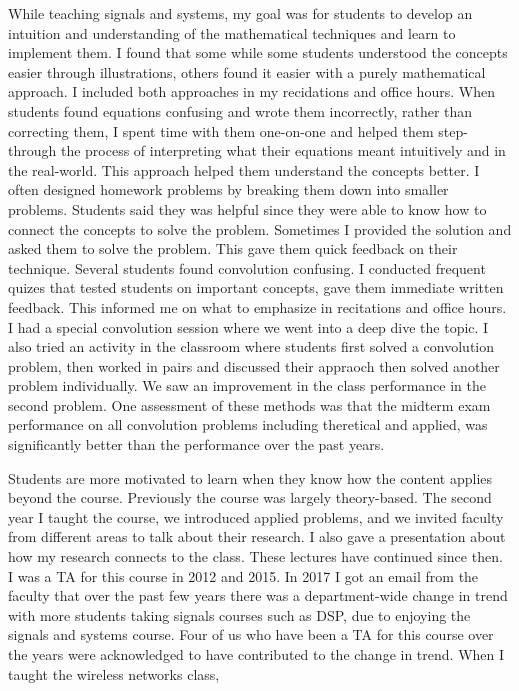 \documentclass[10pt]{article}
\begin{document}
While teaching signals and systems, %
my goal was for students to develop an intuition and understanding of the mathematical techniques and learn to implement them. I found that some while some students understood the concepts easier through illustrations, others found it easier with a purely mathematical approach. I included both approaches in my recidations and office hours. When students found equations confusing and wrote them incorrectly, rather than correcting them, I spent time with them one-on-one and helped them step-through the process of interpreting what their equations meant intuitively and in the real-world. This approach helped them understand the concepts better. %
I often designed homework problems by breaking them down into smaller problems. Students said they was helpful since they were able to know how to connect the concepts to solve the problem. Sometimes I provided the solution and asked them to solve the problem. This gave them quick feedback on their technique.
Several students found convolution confusing. I conducted frequent quizes that tested students on important concepts, gave them immediate written feedback. This informed me on what to emphasize in recitations and office hours.  I had a special convolution session where we went into a deep dive the topic. I also tried an activity in the classroom where students first solved a convolution problem, then worked in pairs and discussed their appraoch then solved another problem individually. We saw an improvement in the class performance in the second problem. One assessment of these methods was that the midterm exam performance on all convolution problems including theretical and applied, was significantly better than the performance over the past years. 

Students are more motivated to learn when they know how the content applies beyond the course. %
Previously the course was largely theory-based. The second year I taught the course, we introduced applied problems, and we invited faculty from different areas to talk about their research. I also gave a presentation about how my research connects to the class. These lectures have continued since then.  I was a TA for this course in 2012 and 2015. In 2017 I got an email from the faculty that over the past few years there was a department-wide change in trend with more students taking signals courses such as DSP, due to enjoying the signals and systems course. Four of us who have been a TA for this course over the years were acknowledged to have contributed to the change in trend. When I taught the wireless networks class, 
\end{document}
